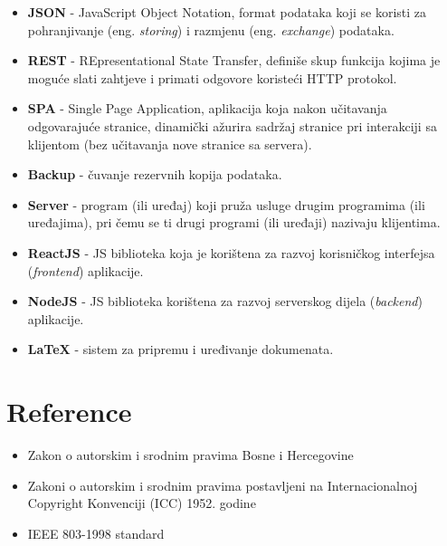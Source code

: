 \begin{itemize}
    \item \textbf{JSON} - JavaScript Object Notation, format podataka koji se koristi za pohranjivanje (eng. \textit{storing}) i razmjenu (eng. \textit{exchange}) podataka.
    \item \textbf{REST} - REpresentational State Transfer, definiše skup funkcija kojima je moguće slati zahtjeve i primati odgovore koristeći HTTP protokol.
    \item \textbf{SPA} - Single Page Application, aplikacija koja nakon učitavanja odgovarajuće stranice, dinamički ažurira sadržaj stranice pri interakciji sa klijentom (bez učitavanja nove stranice sa servera).
    \item \textbf{Backup} - čuvanje rezervnih kopija podataka.
    \item \textbf{Server} - program (ili uređaj) koji pruža usluge drugim programima (ili uređajima), pri čemu se ti drugi programi (ili uređaji) nazivaju klijentima.
    \item \textbf{ReactJS} - JS biblioteka koja je korištena za razvoj korisničkog interfejsa (\textit{frontend}) aplikacije.
    \item \textbf{NodeJS} - JS biblioteka korištena za razvoj serverskog dijela (\textit{backend}) aplikacije.
    \item \textbf{\LaTeX} - sistem za pripremu i uređivanje dokumenata.
\end{itemize}

\section{Reference}

 \begin{itemize}
     \item Zakon o autorskim i srodnim pravima Bosne i Hercegovine
     \item Zakoni o autorskim i srodnim pravima postavljeni na Internacionalnoj Copyright Konvenciji (ICC) 1952. godine
     \item IEEE 803-1998 standard
 \end{itemize}